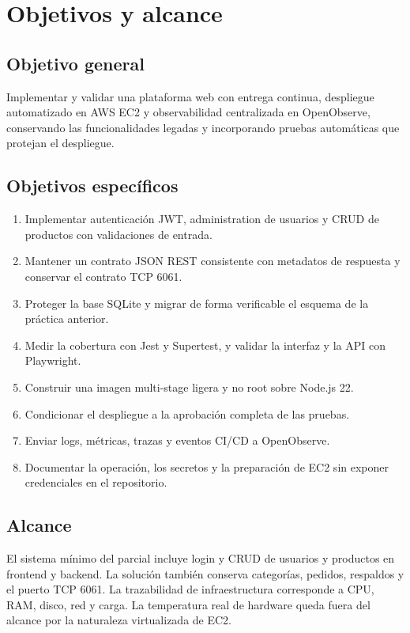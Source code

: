 \documentclass[12pt,a4paper]{article}
\begin{document}
\section{Objetivos y alcance}

\subsection{Objetivo general}
Implementar y validar una plataforma web con entrega continua, despliegue automatizado en AWS EC2 y observabilidad centralizada en OpenObserve, conservando las funcionalidades legadas y incorporando pruebas automáticas que protejan el despliegue.

\subsection{Objetivos específicos}
\begin{enumerate}
  \item Implementar autenticación JWT, administration de usuarios y CRUD de productos con validaciones de entrada.
  \item Mantener un contrato JSON REST consistente con metadatos de respuesta y conservar el contrato TCP 6061.
  \item Proteger la base SQLite y migrar de forma verificable el esquema de la práctica anterior.
  \item Medir la cobertura con Jest y Supertest, y validar la interfaz y la API con Playwright.
  \item Construir una imagen multi-stage ligera y no root sobre Node.js 22.
  \item Condicionar el despliegue a la aprobación completa de las pruebas.
  \item Enviar logs, métricas, trazas y eventos CI/CD a OpenObserve.
  \item Documentar la operación, los secretos y la preparación de EC2 sin exponer credenciales en el repositorio.
\end{enumerate}

\subsection{Alcance}
El sistema mínimo del parcial incluye login y CRUD de usuarios y productos en frontend y backend. La solución también conserva categorías, pedidos, respaldos y el puerto TCP 6061. La trazabilidad de infraestructura corresponde a CPU, RAM, disco, red y carga. La temperatura real de hardware queda fuera del alcance por la naturaleza virtualizada de EC2.
\end{document}
